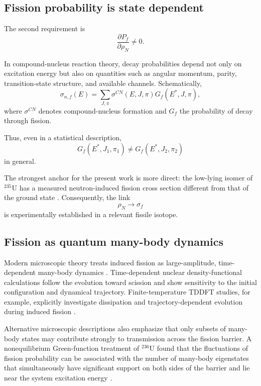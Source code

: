 \subsection{Fission probability is state dependent}

The second requirement is
\begin{equation}
\frac{\partial P_f}{\partial\rho_N}
\neq0.
\end{equation}

In compound-nucleus reaction theory, decay probabilities depend not only on excitation energy but also on quantities such as angular momentum, parity, transition-state structure, and available channels. Schematically,
\begin{equation}
\sigma_{n,f}(E)
=
\sum_{J,\pi}
\sigma^{CN}(E,J,\pi)
G_f(E^\ast,J,\pi),
\end{equation}
where $\sigma^{CN}$ denotes compound-nucleus formation and $G_f$ the probability of decay through fission.

Thus, even in a statistical description,
\begin{equation}
G_f(E^\ast,J_1,\pi_1)
\neq
G_f(E^\ast,J_2,\pi_2)
\end{equation}
in general.

The strongest anchor for the present work is more direct: the low-lying isomer of $^{235}$U has a measured neutron-induced fission cross section different from that of the ground state \cite{DEer1988}. Consequently, the link
\begin{equation}
\rho_N\rightarrow\sigma_f
\end{equation}
is experimentally established in a relevant fissile isotope.

\subsection{Fission as quantum many-body dynamics}

Modern microscopic theory treats induced fission as large-amplitude, time-dependent many-body dynamics \cite{SchunckRobledo2016}. Time-dependent nuclear density-functional calculations follow the evolution toward scission and show sensitivity to the initial configuration and dynamical trajectory. Finite-temperature TDDFT studies, for example, explicitly investigate dissipation and trajectory-dependent evolution during induced fission \cite{Li2023}.

Alternative microscopic descriptions also emphasize that only subsets of many-body states may contribute strongly to transmission across the fission barrier. A nonequilibrium Green-function treatment of $^{236}$U found that the fluctuations of fission probability can be associated with the number of many-body eigenstates that simultaneously have significant support on both sides of the barrier and lie near the system excitation energy \cite{UzawaHagino2024}.


